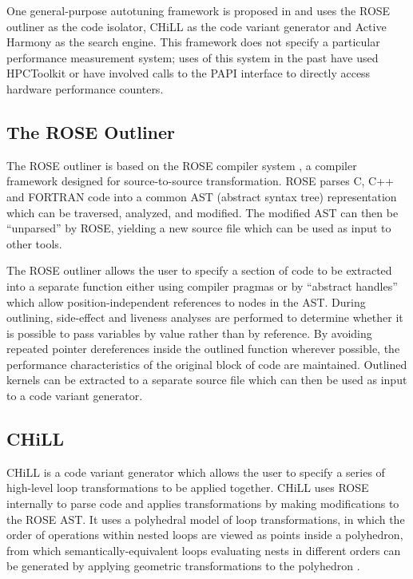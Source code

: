\documentclass[msthesis,justified,copyright,final,numbers,sort&compress,
gsmodern,amstex,natbib]{uothesis}
\begin{document}
One general-purpose autotuning framework is proposed in \cite{full} and uses the ROSE outliner \cite{outlining} as the code isolator, CHiLL \cite{chill} as the code variant generator and Active Harmony \cite{harmony} as the search engine. This framework does not specify a particular performance measurement system; uses of this system in the past have used HPCToolkit \cite{hpctoolkit} or have involved calls to the PAPI \cite{papi} interface to directly access hardware performance counters. 

\subsection{The ROSE Outliner}

The ROSE outliner \cite{outlining} is based on the ROSE compiler system \cite{rose}, a compiler framework designed for source-to-source transformation. ROSE parses C, C++ and FORTRAN code into a common AST (abstract syntax tree) representation which can be traversed, analyzed, and modified. The modified AST can then be ``unparsed'' by ROSE, yielding a new source file which can be used as input to other tools.

The ROSE outliner allows the user to specify a section of code to be extracted into a separate function either using compiler pragmas or by ``abstract handles'' which allow position-independent references to nodes in the AST. During outlining, side-effect and liveness analyses are performed to determine whether it is possible to pass variables by value rather than by reference. By avoiding repeated pointer dereferences inside the outlined function wherever possible, the performance characteristics of the original block of code are maintained. Outlined kernels can be extracted to a separate source file which can then be used as input to a code variant generator.

\subsection{CHiLL}

CHiLL \cite{chill} is a code variant generator which allows the user to specify a series of high-level loop transformations to be applied together. CHiLL uses ROSE internally to parse code and applies transformations by making modifications to the ROSE AST. It uses a polyhedral model of loop transformations, in which the order of operations within nested loops are viewed as points inside a polyhedron, from which semantically-equivalent loops evaluating nests in different orders can be generated by applying geometric transformations to the polyhedron \cite{polytope}.
\end{document}
